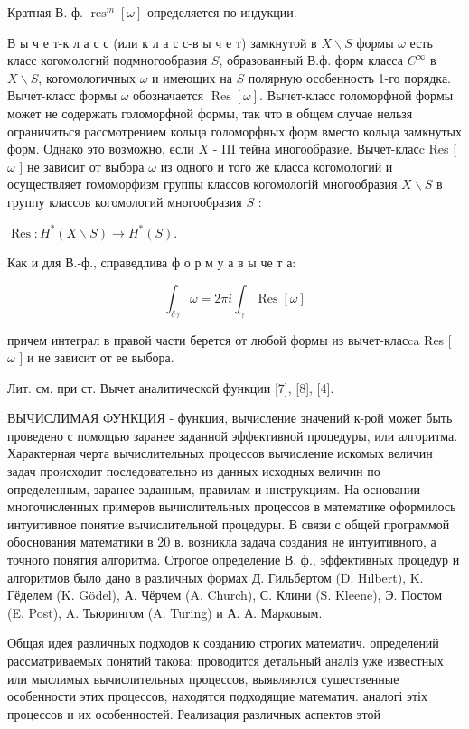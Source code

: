 \documentclass[10pt]{article}
\begin{document}
Кратная В.-ф. $\operatorname{res}^{m}[\omega]$ определяется по индукции.



В ы ч е т-к л а с с (или к л а с с-в ы ч е т) замкнутой в $X \backslash S$ формы $\omega$ есть класс когомологий подмногообразия $S$, образованный В.ф. форм класса $C^{\infty}$ в $X \backslash S$, когомологичных $\omega$ и имеющих на $S$ полярную особенность 1-го порядка. Вычет-класс формы $\omega$ обозначается $\operatorname{Res}[\omega]$. Вычет-класс голоморфной формы может не содержать голоморфной формы, так что в общем случае нельзя ограничиться рассмотрением кольца голоморфных форм вместо кольца замкнутых форм. Однако это возможно, если $X$ - III тейна многообразие. Вычет-класc Res [ $\omega$ ] не зависит от выбора $\omega$ из одного и того же класса когомологий и осуществляет гомоморфизм группы классов когомологій многообразия $X \backslash S$ в группу классов когомологий многообразия $S$ :



$\operatorname{Res}: H^{*}(X \backslash S) \longrightarrow H^{*}(S)$.



Как и для В.-ф., справедлива ф о р м у а в ы че т а:



\[

\int_{\delta \gamma} \omega=2 \pi i \int_{\gamma} \operatorname{Res}[\omega]

\]



причем интеграл в правой части берется от любой формы из вычет-класca Res [ $\omega$ ] и не зависит от ее выбора.



Лит. см. при ст. Вычет аналитической функции [7], [8], [4].



ВЫЧИСЛИМАЯ ФУНКЦИЯ - функция, вычисление значений к-рой может быть проведено с помощью заранее заданной эффективной процедуры, или алгоритма. Характерная черта вычислительных процессов вычисление искомых величин задач происходит последовательно из данных исходных величин по определенным, заранее заданным, правилам и ннструкциям. На основании многочисленных примеров вычислительных процессов в математике оформилось интуитивное понятие вычислительной процедуры. В связи с общей программой обоснования математики в 20 в. возникла задача создания не интуитивного, а точного понятия алгоритма. Строгое определение В. ф., эффективных процедур и алгоритмов было дано в различных формах Д. Гильбертом (D. Hilbert), K. Гёделем (K. Gödel), А. Чёрчем (A. Church), С. Клини (S. Kleene), Э. Постом (E. Post), A. Тьюрингом (A. Turing) и А. А. Марковым.



Общая идея различных подходов к созданию строгих математич. определений рассматриваемых понятий такова: проводится детальный аналіз уже известных или мыслимых вычислительных процессов, выявляются существенные особенности этих процессов, находятся подходящие математич. аналогі этіх процессов и их особенностей. Реализация различных аспектов этой
\end{document}
